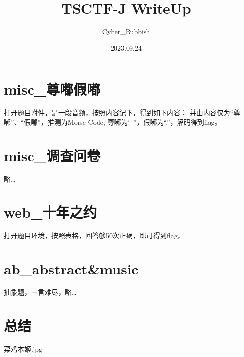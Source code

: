 \documentclass[a4paper]{article}
\title{\heiti\zihao{2} TSCTF-J WriteUp}
\author{\songti\zihao{4} Cyber\_Rubbish}
\date{2023.09.24}
\begin{document}
    \maketitle
\tableofcontents
\section{misc\_尊嘟假嘟}

打开题目附件，是一段音频，按照内容记下，得到如下内容：
并由内容仅为“尊嘟”、“假嘟”，推测为Morse Code, 尊嘟为“-”，假嘟为“.”，解码得到flag。
\begin{figure}[H]
    \centering

\end{figure}
\section{misc\_调查问卷}
略\dots
\section{web\_十年之约}
打开题目环境，按照表格，回答够50次正确，即可得到flag。
\section{ab\_abstract\&music}
抽象题，一言难尽，略\dots
\section{总结}
菜鸡本姬.jpg
\end{document}
